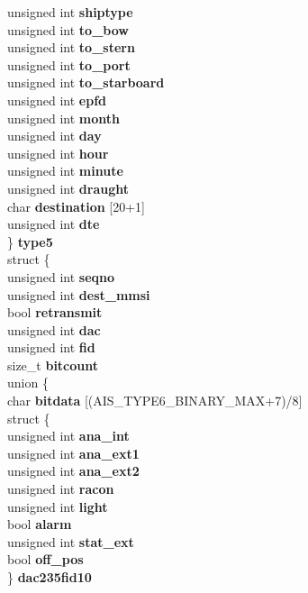 \begin{DoxyCompactItemize}
{\begin{tabbing}
\>\>unsigned int {\bfseries shiptype}\\
\>\>unsigned int {\bfseries to\_bow}\\
\>\>unsigned int {\bfseries to\_stern}\\
\>\>unsigned int {\bfseries to\_port}\\
\>\>unsigned int {\bfseries to\_starboard}\\
\>\>unsigned int {\bfseries epfd}\\
\>\>unsigned int {\bfseries month}\\
\>\>unsigned int {\bfseries day}\\
\>\>unsigned int {\bfseries hour}\\
\>\>unsigned int {\bfseries minute}\\
\>\>unsigned int {\bfseries draught}\\
\>\>char {\bfseries destination} \mbox{[}20+1\mbox{]}\\
\>\>unsigned int {\bfseries dte}\\
\>\} {\bfseries type5}\\
\>struct \{\\
\>\>unsigned int {\bfseries seqno}\\
\>\>unsigned int {\bfseries dest\_mmsi}\\
\>\>bool {\bfseries retransmit}\\
\>\>unsigned int {\bfseries dac}\\
\>\>unsigned int {\bfseries fid}\\
\>\>size\_t {\bfseries bitcount}\\
\hypertarget{structais__t_1_1@34_1_1@39_a2b3f42c4a663c1cf4bb37668a34c3c97}{\>\>union \{\\
\>\>\>char {\bfseries bitdata} \mbox{[}(AIS\_TYPE6\_BINARY\_MAX+7)/8\mbox{]}\\
\>\>\>struct \{\\
\>\>\>\>unsigned int {\bfseries ana\_int}\\
\>\>\>\>unsigned int {\bfseries ana\_ext1}\\
\>\>\>\>unsigned int {\bfseries ana\_ext2}\\
\>\>\>\>unsigned int {\bfseries racon}\\
\>\>\>\>unsigned int {\bfseries light}\\
\>\>\>\>bool {\bfseries alarm}\\
\>\>\>\>unsigned int {\bfseries stat\_ext}\\
\>\>\>\>bool {\bfseries off\_pos}\\
\>\>\>\} {\bfseries dac235fid10}\\
}
\end{tabbing}}
\end{DoxyCompactItemize}
